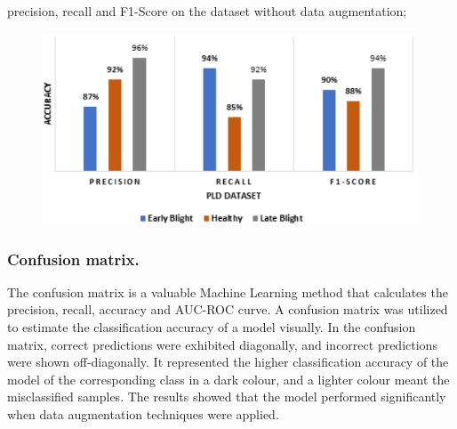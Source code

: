 \documentclass[11pt]{report}
\begin{document}
precision, recall and F1-Score on the dataset without data augmentation;\\
\begin{figure}[h]
	\centerline{\small 
		\includegraphics[height=0.25\textheight]  {p6}}
\end{figure}

\newpage
\subsubsection*{Confusion matrix.}
The confusion matrix is a valuable Machine Learning method that calculates the precision, recall, accuracy and AUC-ROC curve. A confusion matrix was utilized to
estimate the classification accuracy of a model visually. In the confusion matrix, correct
predictions were exhibited diagonally, and incorrect predictions were shown off-diagonally.
It represented the higher classification accuracy of the model of the corresponding class in a dark colour, and a lighter colour meant the misclassified samples. The results showed
that the model performed significantly when data augmentation
techniques were applied.\\
\end{document}
